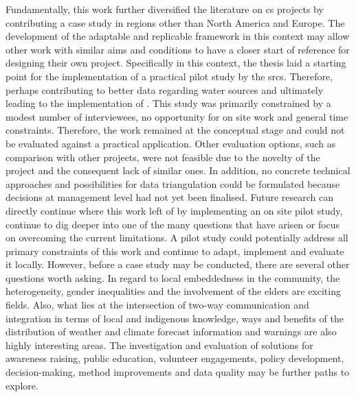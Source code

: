 Fundamentally, this work further diversified the literature on \acrlong{cs} projects by contributing a case study in regions other than North America and Europe. The development of the adaptable and replicable framework in this context may allow other work with similar aims and conditions to have a closer start of reference for designing their own project. Specifically in this context, the thesis laid a starting point for the implementation of a practical pilot study by the \acrlong{srcs}. Therefore, perhaps contributing to better data regarding water sources and ultimately leading to the implementation of .\newline
This study was primarily constrained by a modest number of interviewees, no opportunity for on site work and general time constraints. Therefore, the work remained at the conceptual stage and could not be evaluated against a practical application. Other evaluation options, such as comparison with other projects, were not feasible due to the novelty of the project and the consequent lack of similar ones. In addition, no concrete technical approaches and possibilities for data triangulation could be formulated because decisions at management level had not yet been finalised.\newline
Future research can directly continue where this work left of by implementing an on site pilot study, continue to dig deeper into one of the many questions that have arisen or focus on overcoming the current limitations.
A pilot study could potentially address all primary constraints of this work and continue to adapt, implement and evaluate it locally. However, before a case study may be conducted, there are several other questions worth asking. In regard to local embeddedness in the community, the heterogeneity, gender inequalities and the involvement of the elders are exciting fields. Also, what lies at the intersection of two-way communication and integration in terms of local and indigenous knowledge, ways and benefits of the distribution of weather and climate forecast information and warnings are also highly interesting areas. The investigation and evaluation of solutions for awareness raising, public education, volunteer engagements, policy development, decision-making, method improvements and data quality may be further paths to explore.\newline
